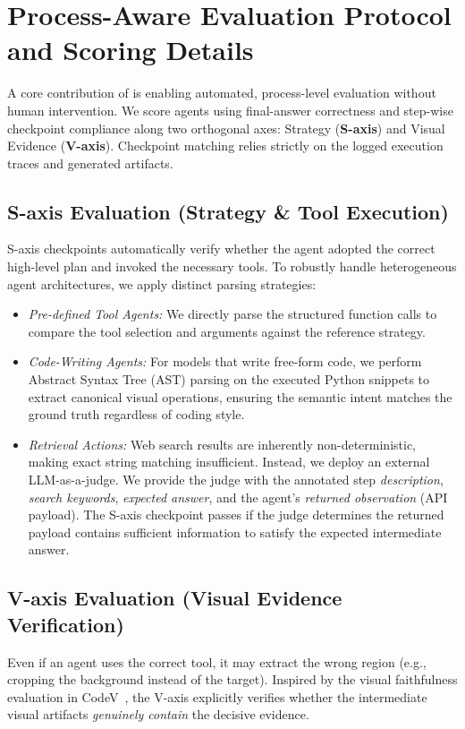 \documentclass[runningheads]{llncs}
\theoremstyle{plain}
\theoremstyle{definition}
\theoremstyle{remark}
\begin{document}
\section{Process-Aware Evaluation Protocol and Scoring Details}
\label{app:eval_protocol}

A core contribution of is enabling automated, process-level evaluation without human intervention. We score agents using final-answer correctness and step-wise checkpoint compliance along two orthogonal axes: Strategy (\textbf{S-axis}) and Visual Evidence (\textbf{V-axis}). Checkpoint matching relies strictly on the logged execution traces and generated artifacts.

\subsection{S-axis Evaluation (Strategy \& Tool Execution)}
S-axis checkpoints automatically verify whether the agent adopted the correct high-level plan and invoked the necessary tools. To robustly handle heterogeneous agent architectures, we apply distinct parsing strategies:
\begin{itemize}[leftmargin=*,itemsep=0pt,parsep=0pt,topsep=2pt]
    \item \textit{Pre-defined Tool Agents:} We directly parse the structured function calls to compare the tool selection and arguments against the reference strategy.
    \item \textit{Code-Writing Agents:} For models that write free-form code, we perform Abstract Syntax Tree (AST) parsing on the executed Python snippets to extract canonical visual operations, ensuring the semantic intent matches the ground truth regardless of coding style.
    \item \textit{Retrieval Actions:} Web search results are inherently non-deterministic, making exact string matching insufficient. Instead, we deploy an external LLM-as-a-judge. We provide the judge with the annotated step \emph{description}, \emph{search keywords}, \emph{expected answer}, and the agent's \emph{returned observation} (API payload). The S-axis checkpoint passes if the judge determines the returned payload contains sufficient information to satisfy the expected intermediate answer.
\end{itemize}

\subsection{V-axis Evaluation (Visual Evidence Verification)}
Even if an agent uses the correct tool, it may extract the wrong region (e.g., cropping the background instead of the target). Inspired by the visual faithfulness evaluation in CodeV~\cite{hou2025codev}, the V-axis explicitly verifies whether the intermediate visual artifacts \emph{genuinely contain} the decisive evidence.
\end{document}
